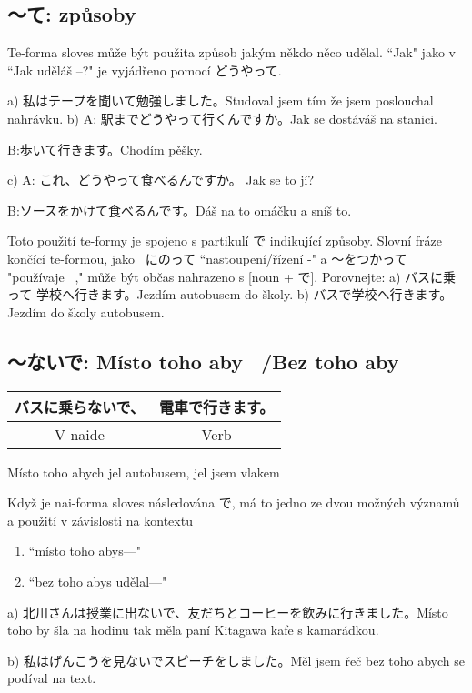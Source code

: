 \subsection{ 〜て: způsoby}
Te-forma sloves může být použita způsob jakým někdo něco udělal. “Jak" jako v  “Jak uděláš --?" je vyjádřeno pomocí  どうやって.

a) 私はテープを聞いて勉強しました。Studoval jsem tím že jsem poslouchal nahrávku.
b) A: 駅までどうやって行くんですか。Jak se dostáváš na stanici.

B:歩いて行きます。Chodím pěšky.

c) A: これ、どうやって食べるんですか。 Jak se to jí?

B:ソースをかけて食べるんです。Dáš na to omáčku a sníš to.

Toto použití te-formy je spojeno s partikulí で indikující způsoby. Slovní fráze končící te-formou, jako  ~にのって “nastoupení/řízení -" a 〜をつかって "používaje ~," může být občas nahrazeno s [noun + で].
Porovnejte:
a) バスに乗って 学校へ行きます。Jezdím autobusem do školy.
b) バスで学校へ行きます。Jezdím do školy autobusem.



\subsection{ 〜ないで: Místo toho aby ~/Bez toho aby}
\begin{center}
\begin{tabular}{|c|c|}
\hline
バスに乗らないで、&電車で行きます。\\
\hline
V naide&Verb\\
\hline
\end{tabular}
\end{center}

Místo toho abych jel autobusem, jel jsem vlakem


Když je nai-forma sloves následována  で, má to jedno ze dvou možných významů a použití v závislosti na kontextu
\begin{enumerate}
\item “místo toho abys---"
\item “bez toho abys udělal---"
\end{enumerate}

a) 北川さんは授業に出ないで、友だちとコーヒーを飲みに行きました。Místo toho by šla na hodinu tak měla paní Kitagawa kafe s kamarádkou.

b) 私はげんこうを見ないでスピーチをしました。Měl jsem řeč bez toho abych se podíval na text.



